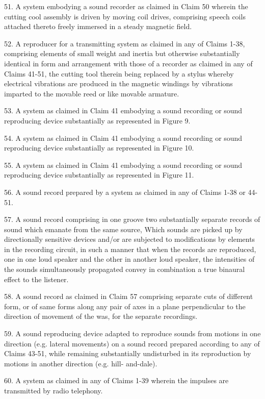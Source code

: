 \documentclass[11pt]{article}
\begin{document}
\begin{multicols*}{2}
51. A system embodying a sound recorder as claimed in Claim 50 wherein the cutting cool assembly is driven by moving coil drives, comprising speech coils attached thereto freely immersed in  a steady magnetic field. 

52. A reproducer for a transmitting system as claimed in any of Claims 1-38, comprising elements of small weight and inertia but otherwise substantially identical in form and arrangement with those of a recorder as claimed in any of Claims 41-51, the cutting tool therein being replaced by a stylus whereby electrical vibrations are produced in the magnetic windings by vibrations imparted to the movable reed or like movable armature. 

53. A system as claimed in Claim 41 embodying a sound recording or sound reproducing device substantially as represented in Figure 9.
 
54. A system as claimed in Claim 41 embodying a sound recording or sound reproducing device substantially as represented in Figure 10. 

55. A system as claimed in Claim 41 embodying a sound recording or sound reproducing device substantially as represented in Figure 11. 

56. A sound record prepared by a system as claimed in any of Claims 1-38 or 44-51. 

57. A sound record comprising in one groove two substantially separate records of sound which emanate from the same source, Which sounds are picked up by directionally sensitive devices and/or are subjected to modifications by elements in the recording circuit, in such a manner that when the records are reproduced, one in one loud speaker and the other in another loud speaker, the intensities of the sounds simultaneously propagated convey in combination a true binaural effect to the listener. 

58. A sound record as claimed in Claim 57 comprising separate cuts of different form, or of same forms along any pair of axes in a plane perpendicular to the direction of movement of the was, for the separate recordings. 

59. A sound reproducing device adapted to reproduce sounds from motions in one direction (e.g. lateral movements) on a sound record prepared according to any of Claims 43-51, while remaining substantially undisturbed in its reproduction by motions in another direction (e.g. hill- and-dale).

60. A system as claimed in any of Claims 1-39 wherein the impulses are transmitted by radio telephony.


\end{multicols*}
\end{document}
